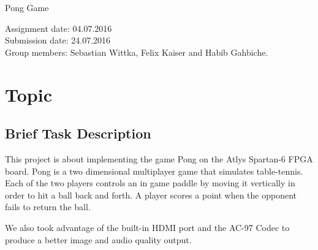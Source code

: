 \documentclass[12pt]{article}
\begin{document}
 

\thispagestyle{empty}     %
\null\vspace{40mm}
\begin{center}
{%
\LARGE  Pong Game}
\\[15mm]
\vspace{25mm}



\parbox{0.9\textwidth}{   %
\small }
\end{center}
\vfill 
\begin{center}
Assignment date: 04.07.2016
\\
Submission date: 24.07.2016
\\

Group members: Sebastian Wittka, Felix Kaiser and Habib Gahbiche.
\end{center}
\vspace{20mm}
\newpage
\tableofcontents  
\null\thispagestyle{empty} 
\newpage


\section{Topic}
	\subsection{Brief Task Description}
	This project is about implementing the game Pong on the Atlys Spartan-6 FPGA board. Pong is a two dimensional multiplayer game that simulates table-tennis. Each of the two players controls an in game paddle by moving it vertically in order to hit a ball back and forth. A player scores a point when the opponent fails to return the ball. 
	
	We also took advantage of the built-in HDMI port and the AC-97 Codec to produce a better image and audio quality output. 
	
\end{document}
